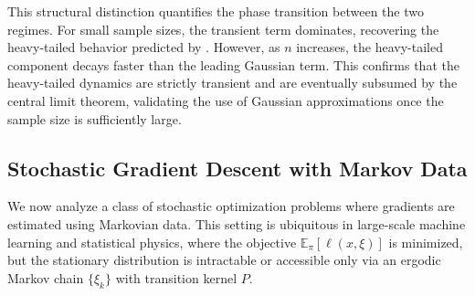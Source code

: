 \documentclass[11pt]{article}
\begin{document}
This structural distinction quantifies the phase transition between the two regimes. 
For small sample sizes, the transient term dominates, recovering the heavy-tailed behavior predicted by . 
However, as $n$ increases, the heavy-tailed component decays faster than the leading Gaussian term. 
This confirms that the heavy-tailed dynamics are strictly transient and are eventually subsumed by the central limit theorem, validating the use of Gaussian approximations once the sample size is sufficiently large. 



\subsection{Stochastic Gradient Descent with Markov Data}\label{sec:mcmc}
We now analyze a class of stochastic optimization problems where gradients are estimated using Markovian data. 
This setting is ubiquitous in large-scale machine learning and statistical physics, where the objective $\mathbb{E}_{\pi}[\ell(x, \xi)]$ is minimized, but the stationary distribution is intractable or accessible only via an ergodic Markov chain $\{\xi_k \}$ with transition kernel $P$.
\end{document}
